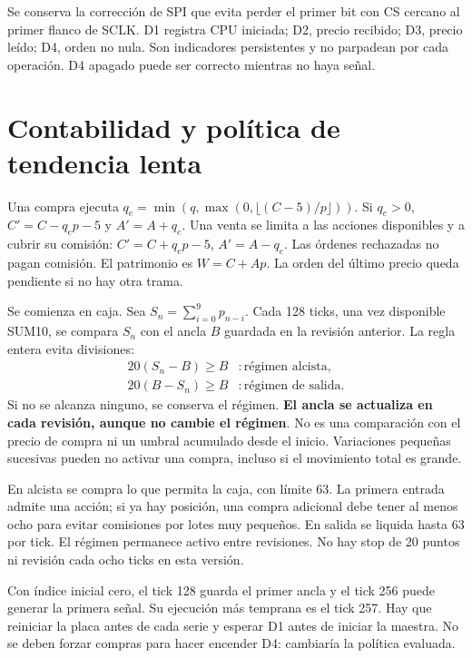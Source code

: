 \documentclass[11pt,a4paper]{article}
\begin{document}
Se conserva la corrección de SPI que evita perder el primer bit con CS cercano
al primer flanco de SCLK. D1 registra CPU iniciada; D2, precio recibido; D3,
precio leído; D4, orden no nula. Son indicadores persistentes y no parpadean
por cada operación. D4 apagado puede ser correcto mientras no haya señal.

\section{Contabilidad y política de tendencia lenta}
Una compra ejecuta $q_e=\min(q,\max(0,\lfloor(C-5)/p\rfloor))$.
Si $q_e>0$, $C'=C-q_ep-5$ y $A'=A+q_e$. Una venta se limita a las
acciones disponibles y a cubrir su comisión: $C'=C+q_ep-5$, $A'=A-q_e$.
Las órdenes rechazadas no pagan comisión. El patrimonio es $W=C+Ap$.
La orden del último precio queda pendiente si no hay otra trama.

Se comienza en caja. Sea $S_n=\sum_{i=0}^{9}p_{n-i}$. Cada 128 ticks,
una vez disponible SUM10, se compara $S_n$ con el ancla $B$ guardada en la
revisión anterior. La regla entera evita divisiones:
\[
\begin{array}{ll}
20(S_n-B)\ge B &: \text{régimen alcista},\\
20(B-S_n)\ge B &: \text{régimen de salida}.
\end{array}
\]
Si no se alcanza ninguno, se conserva el régimen. \textbf{El ancla se actualiza
en cada revisión, aunque no cambie el régimen}. No es una comparación con el
precio de compra ni un umbral acumulado desde el inicio. Variaciones pequeñas
sucesivas pueden no activar una compra, incluso si el movimiento total es grande.

En alcista se compra lo que permita la caja, con límite 63. La primera entrada
admite una acción; si ya hay posición, una compra adicional debe tener al menos
ocho para evitar comisiones por lotes muy pequeños. En salida se liquida hasta
63 por tick. El régimen permanece activo entre revisiones. No hay stop de
20 puntos ni revisión cada ocho ticks en esta versión.

Con índice inicial cero, el tick 128 guarda el primer ancla y el tick 256 puede
generar la primera señal. Su ejecución más temprana es el tick 257. Hay que
reiniciar la placa antes de cada serie y esperar D1 antes de iniciar la maestra.
No se deben forzar compras para hacer encender D4: cambiaría la política evaluada.
\end{document}
